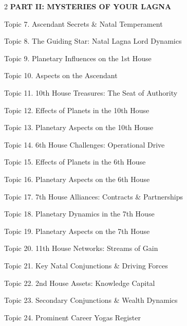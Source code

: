\documentclass[10pt,oneside]{article}
\renewcommand{\textls}[2][60]{#2}
\begin{document}
\begin{multicols}{2}
  {\sffamily\fontsize{8.5}{11}\selectfont\bfseries\color{ExecutiveNavy}\textls[60]{PART II: MYSTERIES OF YOUR LAGNA}}\par
  \vspace{1mm}
  {\fontsize{8}{11.5}\selectfont
  Topic 7. Ascendant Secrets \& Natal Temperament \dotfill \pageref*{topic7}\par
  Topic 8. The Guiding Star: Natal Lagna Lord Dynamics \dotfill \pageref*{topic8}\par
  Topic 9. Planetary Influences on the 1st House \dotfill \pageref*{topic9}\par
  Topic 10. Aspects on the Ascendant \dotfill \pageref*{topic10}\par
  Topic 11. 10th House Treasures: The Seat of Authority \dotfill \pageref*{topic11}\par
  Topic 12. Effects of Planets in the 10th House \dotfill \pageref*{topic12}\par
  Topic 13. Planetary Aspects on the 10th House \dotfill \pageref*{topic13}\par
  Topic 14. 6th House Challenges: Operational Drive \dotfill \pageref*{topic14}\par
  Topic 15. Effects of Planets in the 6th House \dotfill \pageref*{topic15}\par
  Topic 16. Planetary Aspects on the 6th House \dotfill \pageref*{topic16}\par
  Topic 17. 7th House Alliances: Contracts \& Partnerships \dotfill \pageref*{topic17}\par
  Topic 18. Planetary Dynamics in the 7th House \dotfill \pageref*{topic18}\par
  Topic 19. Planetary Aspects on the 7th House \dotfill \pageref*{topic19}\par
  Topic 20. 11th House Networks: Streams of Gain \dotfill \pageref*{topic20}\par
  Topic 21. Key Natal Conjunctions \& Driving Forces \dotfill \pageref*{topic21}\par
  Topic 22. 2nd House Assets: Knowledge Capital \dotfill \pageref*{topic22}\par
  Topic 23. Secondary Conjunctions \& Wealth Dynamics \dotfill \pageref*{topic23}\par
  Topic 24. Prominent Career Yogas Register \dotfill \pageref*{topic24}\par}

  \columnbreak


\end{multicols}
\end{document}
